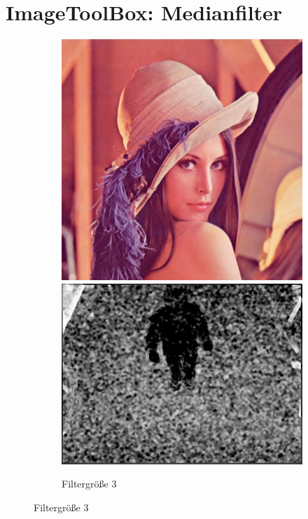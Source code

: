 \section{ImageToolBox: Medianfilter}
\begin{figure}
	\centering
	\begin{subfigure}{.49\textwidth}
		\centering
		\includegraphics[width=.99\linewidth]{A1/lena3.jpg}
		\includegraphics[width=.99\linewidth]{A1/rauschen3.jpg}
		\caption{Filtergröße 3}

\end{subfigure}
\end{figure}
